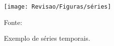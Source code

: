 \begin{figure}[H]
	\centering
	\caption{Exemplo de séries temporais.}
	\label{fig:series}
	\texttt{[image: Revisao/Figuras/séries]}
	
	Fonte: \cite{brandão_2020}
\end{figure}
